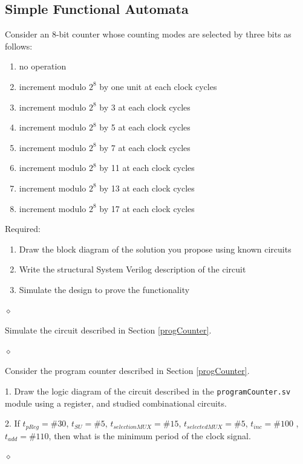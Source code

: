\subsection{Simple Functional Automata}

\begin{problem}
Consider an 8-bit counter whose counting modes are selected by three bits as follows:
\begin{enumerate}
    \item no operation
    \item increment modulo $2^8$ by one unit at each clock cycles
    \item increment modulo $2^8$ by 3 at each clock cycles
    \item increment modulo $2^8$ by 5 at each clock cycles
    \item increment modulo $2^8$ by 7 at each clock cycles
    \item increment modulo $2^8$ by 11 at each clock cycles
    \item increment modulo $2^8$ by 13 at each clock cycles
    \item increment modulo $2^8$ by 17 at each clock cycles
\end{enumerate}
Required:
\begin{enumerate}
    \item Draw the block diagram of the solution you propose using known circuits
    \item Write the structural System Verilog description of the circuit
    \item Simulate the design to prove the functionality
\end{enumerate}

$\diamond$
\end{problem}

\begin{problem}
Simulate the circuit described in Section \ref{progCounter}.

$\diamond$
\end{problem}

\begin{problem}
Consider the program counter described in Section \ref{progCounter}.

1. Draw the logic diagram of the circuit described in the {\tt programCounter.sv} module using a register, and studied combinational circuits.

2. If $t_{pReg} = \#30$, $t_{SU} = \#5$, $t_{selectionMUX} = \#15$, $t_{selectedMUX} = \#5$, $t_{inc} = \#100$ , $t_{add} = \#110$, then what is the minimum period of the clock signal.

$\diamond$
\end{problem}

